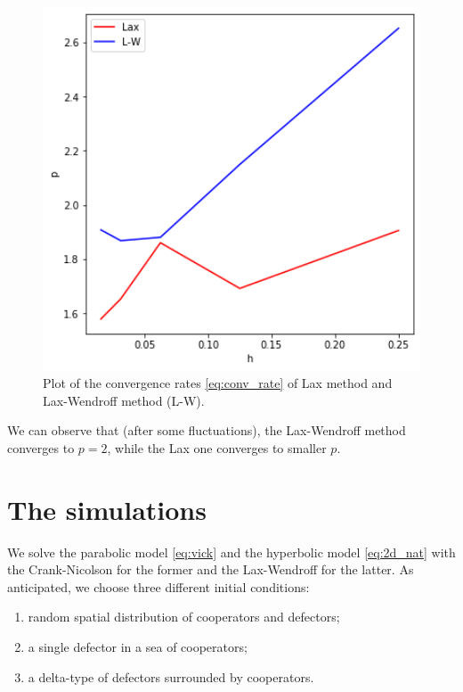 \begin{figure}[H]
\noindent \centering{}\includegraphics[width=1\textwidth]{immagini/validation_r_hyp}\caption{\foreignlanguage{english}{\label{fig:Conv_rate_hyp}Plot of the convergence rates \ref{eq:conv_rate}
of Lax method and Lax-Wendroff method (L-W).}}
\end{figure}

We can observe that (after some fluctuations), the Lax-Wendroff method
converges to $p=2$, while the Lax one converges to smaller $p$.

\section{The simulations\label{sec:The-simulations}}

We solve the parabolic model \ref{eq:vick} and the hyperbolic model
\ref{eq:2d_nat} with the Crank-Nicolson for the former and the Lax-Wendroff
for the latter. As anticipated, we choose three different initial
conditions:
\begin{enumerate}
\item random spatial distribution of cooperators and defectors;
\item a single defector in a sea of cooperators;
\item a delta-type of defectors surrounded by cooperators.
\end{enumerate}


